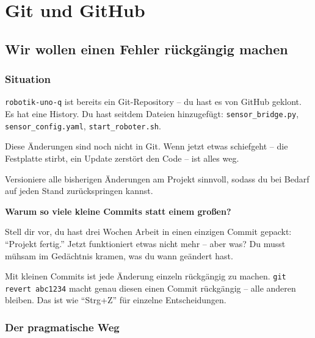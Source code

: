 \part{Git und GitHub}

\chapter{Wir wollen einen Fehler rückgängig machen}

\kapitelstruktur

\section{Situation}

\texttt{robotik-uno-q} ist bereits ein Git-Repository --
du hast es von GitHub geklont. Es hat eine History.
Du hast seitdem Dateien hinzugefügt: \texttt{sensor\_bridge.py},
\texttt{sensor\_config.yaml}, \texttt{start\_roboter.sh}.

Diese Änderungen sind noch nicht in Git.
Wenn jetzt etwas schiefgeht -- die Festplatte stirbt,
ein Update zerstört den Code -- ist alles weg.

\begin{aufgabeBox}
Versioniere alle bisherigen Änderungen am Projekt sinnvoll,
sodass du bei Bedarf auf jeden Stand zurückspringen kannst.
\end{aufgabeBox}

\begin{haubeBox}
\textbf{Warum so viele kleine Commits statt einem großen?}

Stell dir vor, du hast drei Wochen Arbeit in einen einzigen
Commit gepackt: \enquote{Projekt fertig.} Jetzt funktioniert
etwas nicht mehr -- aber was? Du musst mühsam im Gedächtnis
kramen, was du wann geändert hast.

Mit kleinen Commits ist jede Änderung einzeln rückgängig
zu machen. \texttt{git revert abc1234} macht genau diesen
einen Commit rückgängig -- alle anderen bleiben.
Das ist wie \enquote{Strg+Z} für einzelne Entscheidungen.
\end{haubeBox}

\section{Der pragmatische Weg}

